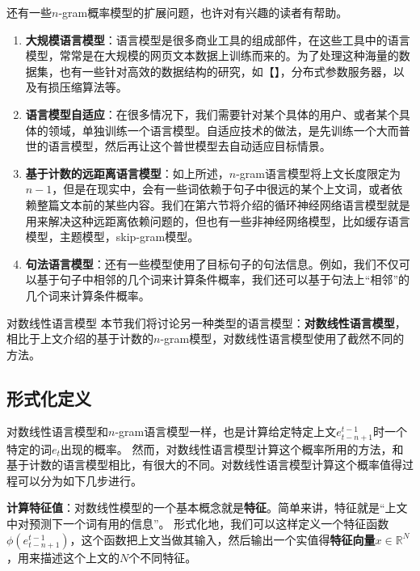 \documentclass[10pt,a4paper]{ctexart}
\makeatletter
\renewcommand{\section}{\@startsection{section}{1}{0mm}
  {-\baselineskip}{0.5\baselineskip}{\bf\leftline}}
\makeatother
\begin{document}
还有一些$n$-gram概率模型的扩展问题，也许对有兴趣的读者有帮助。
\begin{enumerate}
\item[] \textbf{大规模语言模型}：语言模型是很多商业工具的组成部件，在这些工具中的语言模型，常常是在大规模的网页文本数据上训练而来的。为了处理这种海量的数据集，也有一些针对高效的数据结构的研究，如【】，分布式参数服务器，以及有损压缩算法等。
\item[] \textbf{语言模型自适应}：在很多情况下，我们需要针对某个具体的用户、或者某个具体的领域，单独训练一个语言模型。自适应技术的做法，是先训练一个大而普世的语言模型，然后再让这个普世模型去自动适应目标情景。
\item[] \textbf{基于计数的远距离语言模型}：如上所述，$n$-gram语言模型将上文长度限定为$n-1$，但是在现实中，会有一些词依赖于句子中很远的某个上文词，或者依赖整篇文本前的某些内容。我们在第六节将介绍的循环神经网络语言模型就是用来解决这种远距离依赖问题的，但也有一些非神经网络模型，比如缓存语言模型，主题模型，skip-gram模型。
\item[] \textbf{句法语言模型}：还有一些模型使用了目标句子的句法信息。例如，我们不仅可以基于句子中相邻的几个词来计算条件概率，我们还可以基于句法上“相邻”的几个词来计算条件概率。
\end{enumerate}


\section{对数线性语言模型}
本节我们将讨论另一种类型的语言模型：\textbf{对数线性语言模型}，相比于上文介绍的基于计数的$n$-gram模型，对数线性语言模型使用了截然不同的方法。

\subsection{形式化定义}
对数线性语言模型和$n$-gram语言模型一样，也是计算给定特定上文$e_{t-n+1}^{t-1}$时一个特定的词$e_t$出现的概率。
然而，对数线性语言模型计算这个概率所用的方法，和基于计数的语言模型相比，有很大的不同。对数线性语言模型计算这个概率值得过程可以分为如下几步进行。

\textbf{计算特征值}：对数线性模型的一个基本概念就是\textbf{特征}。简单来讲，特征就是“上文中对预测下一个词有用的信息”。
形式化地，我们可以这样定义一个特征函数$\phi (e_{t-n+1}^{t-1})$，这个函数把上文当做其输入，然后输出一个实值得\textbf{特征向量$x$}$\in \mathbb{R}^N$，用来描述这个上文的$N$个不同特征。
\end{document}
